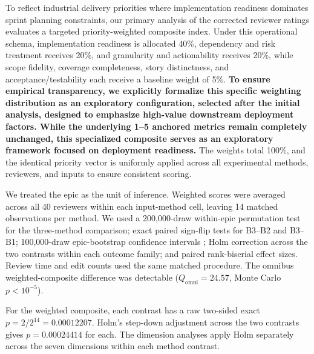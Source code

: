 \documentclass[manuscript,review]{acmart}
\begin{document}
To reflect industrial delivery priorities where implementation readiness dominates sprint planning constraints, our primary analysis of the corrected reviewer ratings evaluates a targeted priority-weighted composite index. Under this operational schema, implementation readiness is allocated 40\%, dependency and risk treatment receives 20\%, and granularity and actionability receives 20\%, while scope fidelity, coverage completeness, story distinctness, and acceptance/testability each receive a baseline weight of 5\%. \textbf{To ensure empirical transparency, we explicitly formalize this specific weighting distribution as an exploratory configuration, selected after the initial analysis, designed to emphasize high-value downstream deployment factors. While the underlying 1--5 anchored metrics remain completely unchanged, this specialized composite serves as an exploratory framework focused on deployment readiness.} The weights total 100\%, and the identical priority vector is uniformly applied across all experimental methods, reviewers, and inputs to ensure consistent scoring.

We treated the epic as the unit of inference. Weighted scores were averaged across all 40 reviewers within each input-method cell, leaving 14 matched observations per method. We used a 200,000-draw within-epic permutation test for the three-method comparison; exact paired sign-flip tests for B3--B2 and B3--B1; 100,000-draw epic-bootstrap confidence intervals \cite{R97}; Holm correction \cite{R96} across the two contrasts within each outcome family; and paired rank-biserial effect sizes. Review time and edit counts used the same matched procedure. The omnibus weighted-composite difference was detectable (\(Q_{\mathrm{omni}}=24.57\), Monte Carlo \(p<10^{-5}\)).

For the weighted composite, each contrast has a raw two-sided exact \(p=2/2^{14}=0.00012207\). Holm's step-down adjustment across the two contrasts gives \(p=0.00024414\) for each. The dimension analyses apply Holm separately across the seven dimensions within each method contrast.
\end{document}
